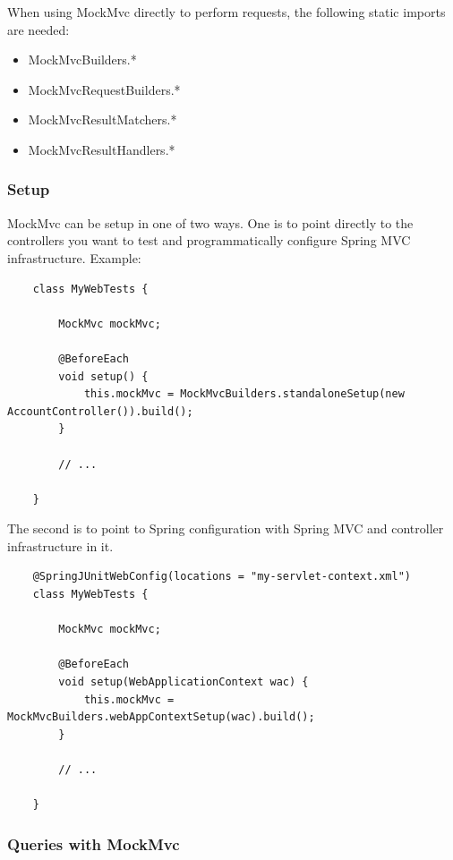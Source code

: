 \documentclass{scrartcl}
\begin{document}
When using MockMvc directly to perform requests, the following static imports are needed:

\begin{itemize}
    \item MockMvcBuilders.*

    \item MockMvcRequestBuilders.*

    \item MockMvcResultMatchers.*

    \item MockMvcResultHandlers.*
\end{itemize}

\subsubsection{Setup}

MockMvc can be setup in one of two ways. One is to point directly to the controllers you want to test and programmatically configure Spring MVC infrastructure. Example:

\begin{lstlisting}
    class MyWebTests {

        MockMvc mockMvc;

        @BeforeEach
        void setup() {
            this.mockMvc = MockMvcBuilders.standaloneSetup(new AccountController()).build();
        }

        // ...

    }
\end{lstlisting}

The second is to point to Spring configuration with Spring MVC and controller infrastructure in it.

\begin{lstlisting}
    @SpringJUnitWebConfig(locations = "my-servlet-context.xml")
    class MyWebTests {

        MockMvc mockMvc;

        @BeforeEach
        void setup(WebApplicationContext wac) {
            this.mockMvc = MockMvcBuilders.webAppContextSetup(wac).build();
        }

        // ...

    }
\end{lstlisting}

\subsubsection{Queries with MockMvc}
\end{document}
